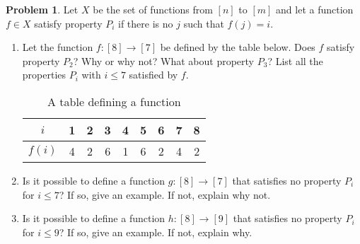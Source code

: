 \documentclass[12pt]{article}
\newcounter{chapternumber}
\theoremstyle{definition}
\newtheorem{problem-internal}{Problem}[chapternumber]
\newenvironment{problem}{
  \medskip
  \begin{problem-internal}
}{
\end{problem-internal}
}
\begin{document}
  \setcounter{problem-internal}{10}
  \begin{problem}
    Let \(X\) be the set of functions from \([n]\) to \([m]\) and let a function \(f \in X\) satisfy property \(P_{i}\) if there is no \(j\) such that \(f(j) = i\).
    \begin{enumerate}[label={\alph*.}]
      \item Let the function \(f:[8] \rightarrow [7]\) be defined by the table below.
      Does \(f\) satisfy property \(P_{2}\)? Why or why not?
      What about property \(P_{3}\)? List all the properties \(P_{i}\) with \(i \leq 7\) satisfied by \(f\).

      \begin{table}[H]
        \centering
        \begin{tabular}{c c c c c c c c c}
          \(i\) & 1 & 2 & 3 & 4 & 5 & 6 & 7 & 8 \\
          \hline
          \(f(i)\) & 4 & 2 & 6 & 1 & 6 & 2 & 4 & 2
        \end{tabular}
        \caption{A table defining a function}
      \end{table}

      \item Is it possible to define a function \(g:[8] \rightarrow [7]\) that satisfies no property \(P_{i}\) for \(i \leq 7\)?
      If so, give an example. If not, explain why not.

      \item Is it possible to define a function \(h:[8] \rightarrow [9]\) that satisfies no property \(P_{i}\) for \(i \leq 9\)? If so, give an example. If not, explain why.
    \end{enumerate}
  \end{problem}
\end{document}
